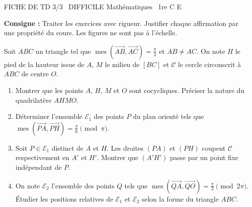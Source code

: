\documentclass[11pt]{article}
\begin{document}
\begin{tcolorbox}[enhanced,colback=popink,colframe=popink,arc=10pt,boxrule=0pt,left=12pt,right=12pt,top=9pt,bottom=9pt]
{\color{white}\popxbold\small FICHE DE TD 3/3 \textbullet\ DIFFICILE \hfill Mathématiques \textbullet\ 1re C E\par}
\end{tcolorbox}
\vspace{4pt}
\noindent \textbf{Consigne :} Traiter les exercices avec rigueur. Justifier chaque affirmation par une propriété du cours. Les figures ne sont pas à l'échelle.

\newcommand{\mes}{\mathop{\mathrm{mes}}\nolimits}
\newcommand{\vect}[1]{\overrightarrow{#1}}

\begin{exercice}
Soit $ABC$ un triangle tel que $\mes(\vect{AB},\vect{AC}) = \frac{\pi}{3}$ et $AB \neq AC$. On note $H$ le pied de la hauteur issue de $A$, $M$ le milieu de $[BC]$ et $\mathcal{C}$ le cercle circonscrit à $ABC$ de centre $O$.
\begin{enumerate}
    \item Montrer que les points $A$, $H$, $M$ et $O$ sont cocycliques. Préciser la nature du quadrilatère $AHMO$.
    \item Déterminer l'ensemble $\mathcal{E}_1$ des points $P$ du plan orienté tels que $\mes(\vect{PA},\vect{PH}) = \frac{\pi}{6} \pmod{\pi}$.
    \item Soit $P \in \mathcal{E}_1$ distinct de $A$ et $H$. Les droites $(PA)$ et $(PH)$ coupent $\mathcal{C}$ respectivement en $A'$ et $H'$. Montrer que $(A'H')$ passe par un point fixe indépendant de $P$.
    \item On note $\mathcal{E}_2$ l'ensemble des points $Q$ tels que $\mes(\vect{QA},\vect{QO}) = \frac{\pi}{3} \pmod{2\pi}$. Étudier les positions relatives de $\mathcal{E}_1$ et $\mathcal{E}_2$ selon la forme du triangle $ABC$.
\end{enumerate}
\end{exercice}
\end{document}
